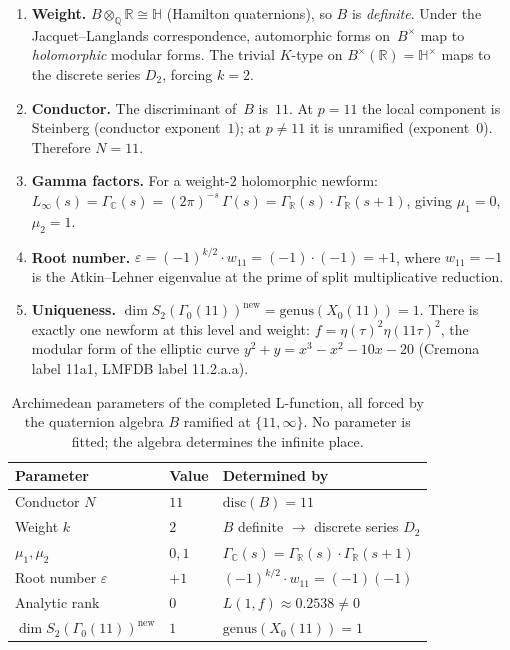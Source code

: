 \documentclass[12pt,reqno]{amsart}
\theoremstyle{plain}
\theoremstyle{definition}
\theoremstyle{remark}
\newcommand{\QQ}{\mathbb{Q}}
\newcommand{\RR}{\mathbb{R}}
\newcommand{\CC}{\mathbb{C}}
\begin{document}
\begin{enumerate}[nosep]
  \item \textbf{Weight.}  $B \otimes_\QQ \RR \cong \mathbb{H}$
    (Hamilton quaternions), so $B$ is \emph{definite}.  Under the
    Jacquet--Langlands correspondence, automorphic forms on~$B^\times$
    map to \emph{holomorphic} modular forms.  The trivial $K$-type on
    $B^\times(\RR) = \mathbb{H}^\times$ maps to the discrete series
    $D_2$, forcing $k = 2$.
  \item \textbf{Conductor.}  The discriminant of~$B$ is~$11$.  At
    $p = 11$ the local component is Steinberg (conductor exponent~$1$);
    at $p \neq 11$ it is unramified (exponent~$0$).  Therefore $N = 11$.
  \item \textbf{Gamma factors.}  For a weight-$2$ holomorphic newform:
    $L_\infty(s) = \Gamma_\CC(s) = (2\pi)^{-s}\, \Gamma(s) =
    \Gamma_\RR(s) \cdot \Gamma_\RR(s+1)$, giving $\mu_1 = 0$,
    $\mu_2 = 1$.
  \item \textbf{Root number.}  $\varepsilon = (-1)^{k/2} \cdot w_{11}
    = (-1) \cdot (-1) = +1$, where $w_{11} = -1$ is the Atkin--Lehner
    eigenvalue at the prime of split multiplicative reduction.
  \item \textbf{Uniqueness.}  $\dim S_2(\Gamma_0(11))^{\mathrm{new}}
    = \mathrm{genus}(X_0(11)) = 1$.  There is exactly one newform at
    this level and weight: $f = \eta(\tau)^2 \eta(11\tau)^2$, the
    modular form of the elliptic curve $y^2 + y = x^3 - x^2 - 10x - 20$
    (Cremona label 11a1, LMFDB label 11.2.a.a).
\end{enumerate}

\begin{table}[ht]
\centering
\renewcommand{\arraystretch}{1.1}
\begin{tabular}{lll}
  \toprule
  Parameter & Value & Determined by \\
  \midrule
  Conductor $N$ & $11$ & $\mathrm{disc}(B) = 11$ \\
  Weight $k$ & $2$ & $B$ definite $\to$ discrete series $D_2$ \\
  $\mu_1, \mu_2$ & $0, 1$ & $\Gamma_\CC(s) = \Gamma_\RR(s) \cdot \Gamma_\RR(s+1)$ \\
  Root number $\varepsilon$ & $+1$ & $(-1)^{k/2} \cdot w_{11} = (-1)(-1)$ \\
  Analytic rank & $0$ & $L(1, f) \approx 0.2538 \neq 0$ \\
  $\dim S_2(\Gamma_0(11))^{\mathrm{new}}$ & $1$ & $\mathrm{genus}(X_0(11)) = 1$ \\
  \bottomrule
\end{tabular}
\caption{Archimedean parameters of the completed L-function, all forced
  by the quaternion algebra $B$ ramified at $\{11, \infty\}$.  No
  parameter is fitted; the algebra determines the infinite place.}
\label{tab:archimedean}
\end{table}
\end{document}
